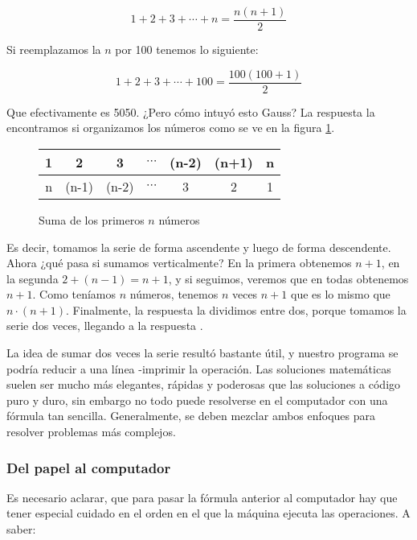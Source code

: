 \begin{equation}
1+2+3+\cdots+n = \frac{n(n+1)}{2}
\end{equation}

Si reemplazamos la $n$ por 100 tenemos lo siguiente:

\begin{equation}
1+2+3+\cdots+100 = \frac{100(100+1)}{2}
\end{equation}

Que efectivamente es 5050. ¿Pero cómo intuyó esto Gauss? La respuesta la encontramos si organizamos los números como se ve en la figura \ref{figgauss}.

\begin{figure}[h!]
\centering
\begin{tabular}{| c | c | c | c | c | c | c |}
\hline
1 & 2 & 3 & $\cdots$ & (n-2) & (n+1) & n \\ \hline
n & (n-1) & (n-2) & $\cdots$ & 3 & 2 & 1 \\ \hline
\end{tabular}
\caption{Suma de los primeros $n$ números}
\label{figgauss}
\end{figure}

Es decir, tomamos la serie de forma ascendente y luego de forma descendente. Ahora ¿qué pasa si sumamos verticalmente? En la primera obtenemos $n+1$, en la segunda $2+(n-1)=n+1$, y si seguimos, veremos que en todas obtenemos $n+1$. Como teníamos $n$ números, tenemos $n$ veces $n+1$ que es lo mismo que $n \cdot (n+1)$. Finalmente, la respuesta la dividimos entre dos, porque tomamos la serie dos veces, llegando a la respuesta \cite{graham1994concrete}.

La idea de sumar dos veces la serie resultó bastante útil, y nuestro programa se podría reducir a una línea -imprimir la operación. Las soluciones matemáticas suelen ser mucho más elegantes, rápidas y poderosas que las soluciones a código puro y duro, sin embargo no todo puede resolverse en el computador con una fórmula tan sencilla. Generalmente, se deben mezclar ambos enfoques para resolver problemas más complejos.



\subsubsection{Del papel al computador}

Es necesario aclarar, que para pasar la fórmula anterior al computador hay que tener especial cuidado en el orden en el que la máquina ejecuta las operaciones. A saber:

